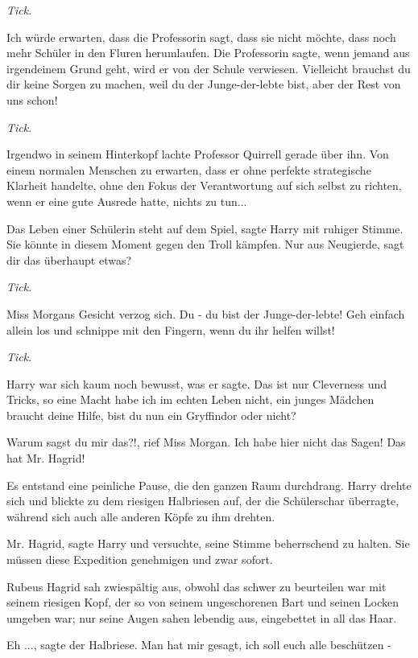 \emph{Tick}.

\glqq{}Ich würde erwarten, dass die Professorin sagt, dass sie nicht möchte, dass
noch mehr Schüler in den Fluren herumlaufen. Die Professorin sagte, wenn jemand
aus irgendeinem Grund geht, wird er von der Schule verwiesen. Vielleicht
brauchst du dir keine Sorgen zu machen, weil du der Junge-der-lebte bist, aber
der Rest von uns schon!\grqq{}

\emph{Tick}.

Irgendwo in seinem Hinterkopf lachte Professor Quirrell gerade über ihn. Von
einem normalen Menschen zu erwarten, dass er ohne perfekte strategische Klarheit
handelte, ohne den Fokus der Verantwortung auf sich selbst zu richten, wenn er
eine gute Ausrede hatte, nichts zu tun...

\glqq{}Das Leben einer Schülerin steht auf dem Spiel\grqq{}, sagte Harry mit
ruhiger Stimme. \glqq{}Sie könnte in diesem Moment gegen den Troll kämpfen. Nur
aus Neugierde, sagt dir das überhaupt etwas?\grqq{}

\emph{Tick}.

Miss Morgans Gesicht verzog sich. \glqq{}Du - du bist der Junge-der-lebte! Geh
einfach allein los und schnippe mit den Fingern, wenn du ihr helfen
willst!\grqq{}

\emph{Tick}.

Harry war sich kaum noch bewusst, was er sagte. \glqq{}Das ist nur Cleverness und
Tricks, so eine Macht habe ich im echten Leben nicht, ein junges Mädchen braucht
deine Hilfe, bist du nun ein Gryffindor oder nicht?\grqq{}

\glqq{}Warum sagst du mir das?!\grqq{}, rief Miss Morgan. \glqq{}Ich habe hier
nicht das Sagen! Das hat Mr. Hagrid!\grqq{}

Es entstand eine peinliche Pause, die den ganzen Raum durchdrang. Harry drehte
sich und blickte zu dem riesigen Halbriesen auf, der die Schülerschar überragte,
während sich auch alle anderen Köpfe zu ihm drehten.

\glqq{}Mr. Hagrid\grqq{}, sagte Harry und versuchte, seine Stimme beherrschend zu
halten. \glqq{}Sie müssen diese Expedition genehmigen und zwar sofort.\grqq{}

Rubeus Hagrid sah zwiespältig aus, obwohl das schwer zu beurteilen war mit
seinem riesigen Kopf, der so von seinem ungeschorenen Bart und seinen Locken
umgeben war; nur seine Augen sahen lebendig aus, eingebettet in all das Haar.

\glqq{}Eh ...\grqq{}, sagte der Halbriese. \glqq{}Man hat mir gesagt, ich soll
euch alle beschützen -\grqq{}

